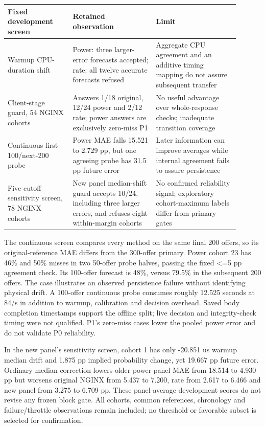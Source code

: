 \documentclass[11pt,a4paper]{article}
\begin{document}
{\small\setlength{\tabcolsep}{2pt}\begin{longtable}{>{\raggedright\arraybackslash}p{0.25200\linewidth}>{\raggedright\arraybackslash}p{0.32400\linewidth}>{\raggedright\arraybackslash}p{0.32400\linewidth}}\toprule
Fixed development screen & Retained observation & Limit \\
\midrule\endhead
Warmup CPU-duration shift & Power: three larger-error forecasts accepted; rate: all twelve accurate forecasts refused & Aggregate CPU agreement and an additive timing mapping do not assure subsequent transfer \\
Client-stage guard, 54 NGINX cohorts & Answers 1/18 original, 12/24 power and 2/12 rate; power answers are exclusively zero-miss P1 & No useful advantage over whole-response checks; inadequate transition coverage \\
Continuous first-100/next-200 probe & Power MAE falls 15.521 to 2.729 pp, but one agreeing probe has 31.5 pp future error & Later information can improve averages while internal agreement fails to assure persistence \\
Five-cutoff sensitivity screen, 78 NGINX cohorts & New panel median-shift guard accepts 10/24, including three larger errors, and refuses eight within-margin cohorts & No confirmed reliability signal; exploratory cohort-maximum labels differ from primary gates \\
\bottomrule\end{longtable}}

The continuous screen compares every method on the same final 200 offers,
so its original-reference MAE differs from the 300-offer primary. Power cohort
23 has 46\% and 50\% misses in two 50-offer probe halves, passing the fixed <=5 pp
agreement check. Its 100-offer forecast is 48\%, versus 79.5\% in the subsequent
200 offers. The case illustrates an observed persistence failure without
identifying physical drift. A 100-offer continuous probe consumes roughly
12.5\textendash{}25 seconds at 8\textendash{}4/s in addition to warmup, calibration and decision overhead.
Saved body completion timestamps support the offline split; live decision and
integrity-check timing were not qualified. P1's zero-miss cases lower the pooled
power error and do not validate P0 reliability.

In the new panel's sensitivity screen, cohort 1 has only -20.851 us warmup
median drift and 1.875 pp implied probability change, yet 19.667 pp future error.
Ordinary median correction lowers older power panel MAE from 18.514 to 4.930 pp
but worsens original NGINX from 5.437 to 7.200, rate from 2.617 to 6.466 and
new panel from 3.275 to 6.709 pp. These panel-average development scores do not
revise any frozen block gate. All cohorts, common references, chronology and
failure/throttle observations remain included; no threshold or favorable subset
is selected for confirmation.
\end{document}
